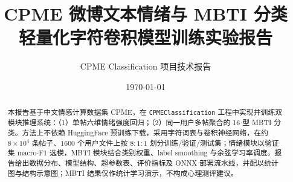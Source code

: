 \title{CPME 微博文本情绪与 MBTI 分类\\{\large 轻量化字符卷积模型训练实验报告}}
\author{CPME Classification 项目技术报告}
\date{\today}
\maketitle

\begin{abstract}
本报告基于中文情感计算数据集 CPME\cite{CPME2024}，在 \texttt{CPMEClassification} 工程中实现并训练双模块推理系统：（1）单帖六维情绪强度回归；（2）同一用户多帖聚合的 16 型 MBTI 分类。方法上不依赖 HuggingFace 预训练下载，采用字符词表与卷积神经网络，在约 $8\times 10^4$ 条帖子、$1600$ 个用户文件上按 $8:1:1$ 划分训练/验证/测试集；情绪模块以验证集 macro-F1 选模，MBTI 模块结合类别权重、label smoothing 与余弦学习率调度。报告给出数据分布、模型结构、超参数表、评价指标及 ONNX 部署流水线，并配以统计图与结构示意图；MBTI 结果仅作统计学习演示，不构成心理测评建议。
\end{abstract}

\tableofcontents
\newpage
